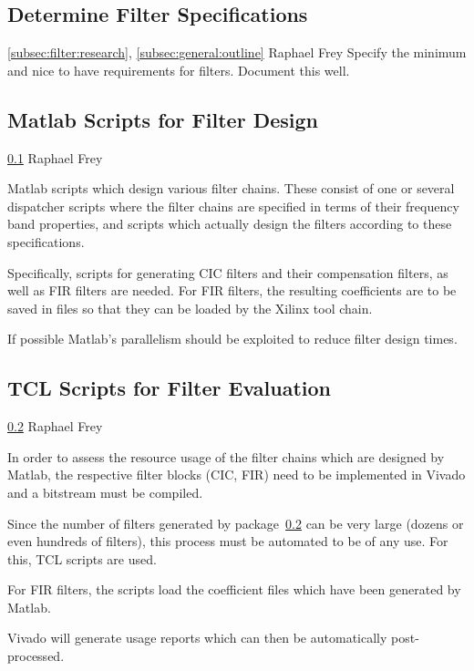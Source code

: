 \documentclass[a4paper,oneside]{alpenspecs/alpenspecs}
\begin{document}
\subsection{Determine Filter Specifications}
\label{subsec:filter:specification}

\wpac
    {}
    {}
    {}
    {\ref{subsec:filter:research}, \ref{subsec:general:outline}}
    {}
    {Raphael Frey}
    {%
        Specify the minimum and nice to have requirements for filters.
        Document this well.
    }

\subsection{Matlab Scripts for Filter Design}
\label{subsec:filter:matlab}

\wpac
    {}
    {}
    {}
    {\ref{subsec:filter:specification}}
    {}
    {Raphael Frey}
    {%
        Matlab scripts which design various filter chains. These consist of one
        or several dispatcher scripts where the filter chains are specified in
        terms of their frequency band properties, and scripts which actually
        design the filters according to these specifications.

        Specifically, scripts for generating CIC filters and their compensation
        filters, as well as FIR filters are needed. For FIR filters, the resulting
        coefficients are to be saved in files so that they can be loaded by the
        Xilinx tool chain.

        If possible Matlab's parallelism should be exploited to reduce filter
        design times.
    }

\subsection{TCL Scripts for Filter Evaluation}
\label{subsec:filter:tcl}

\wpac
    {}
    {}
    {}
    {\ref{subsec:filter:matlab}}
    {}
    {Raphael Frey}
    {%
    In order to assess the resource usage of the filter chains which are
    designed by Matlab, the respective filter blocks (CIC, FIR) need to be
    implemented in Vivado and a bitstream must be compiled.

    Since the number of filters generated by package~\ref{subsec:filter:matlab}
    can be very large (dozens or even hundreds of filters), this process must be automated
    to be of any use. For this, TCL scripts are used.

    For FIR filters, the scripts load the coefficient files which have been
    generated by Matlab.

    Vivado will  generate usage  reports which  can then  be automatically
    post-processed.
    }
\end{document}
